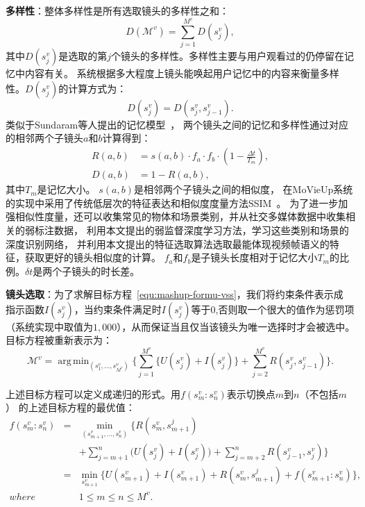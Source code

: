 \documentclass[doctor]{ustcthesis}
\DeclareMathOperator*{\argmin}{arg\,min}
\begin{document}
\textbf{多样性}：整体多样性是所有选取镜头的多样性之和：
\begin{equation}
    D(\mathcal{M}^v) = \sum_{j=1}^{M^v}{D(s_j^v)},
\end{equation}
其中$D(s_j^v)$是选取的第$j$个镜头的多样性。多样性主要与用户观看过的仍停留在记忆中内容有关。
系统根据多大程度上镜头能唤起用户记忆中的内容来衡量多样性。$D(s_j^v)$的计算方式为：
\begin{equation}
    D(s_j^v) = D(s_j^v, s_{j-1}^v).
\end{equation}
类似于Sundaram等人提出的记忆模型~\cite{sundaram2002computable}，
两个镜头之间的记忆和多样性通过对应的相邻两个子镜头$a$和$b$计算得到：
\begin{equation}
    \begin{aligned}
        R(a,b) &= s(a,b)\cdot f_a \cdot f_b \cdot (1- \frac{\Delta t}{T_m} ), \\
        D(a,b) &= 1 - R(a,b),
    \end{aligned}
\end{equation}
其中$T_m$是记忆大小。 $s(a,b)$是相邻两个子镜头之间的相似度，
在MoVieUp系统的实现中采用了传统低层次的特征表达和相似度度量方法SSIM~\cite{WangBSS04Tip}。
为了进一步加强相似性度量，还可以收集常见的物体和场景类别，并从社交多媒体数据中收集相关的弱标注数据，
利用本文提出的弱监督深度学习方法，学习这些类别和场景的深度识别网络，
并利用本文提出的特征选取算法选取最能体现视频帧语义的特征，获取更好的镜头相似度的计算。
$f_a$和$f_b$是子镜头长度相对于记忆大小$T_m$的比例。$\delta t$是两个子镜头的时长差。

\textbf{镜头选取}：为了求解目标方程~\eqref{equ:mashup-formu-vss}，我们将约束条件表示成
指示函数$I(s_j^v)$，当约束条件满足时$I(s_j^v)$等于0,否则取一个很大的值作为惩罚项
（系统实现中取值为$1,000$），从而保证当且仅当该镜头为唯一选择时才会被选中。
目标方程被重新表示为：
\begin{equation}
    \mathcal{M}^v = \argmin_{(s_1^v, \ldots, s_{M^v}^v)}
    \bigg\{ \sum_{j=1}^{M^v}{\big\{U(s_j^v) + I(s_j^v)\big\}}
    +  \sum_{j=2}^{M^v}{R(s_j^v, s_{j-1}^v)} \bigg \}.
    \label{equ:mashup-reformu-vss}
\end{equation}

上述目标方程可以定义成递归的形式。用$f(s_m^v:s_n^v)$表示切换点$m$到$n$（不包括$m$）
的上述目标方程的最优值：
\begin{eqnarray}
    f(s_m^v:s_n^v) &=& \min_{(s_{m+1}^v, \ldots, s_{n}^v)}\bigg\{ R(s_{m}^v,
        s_{m + 1}^j) \nonumber \\
        &&+ \sum_{j=m + 1}^{n}{\Big( U(s_j^v) +I(s_j^v)\Big)}
    + \sum_{j = m + 2}^{n}{R(s_{j - 1}^v, s_{j}^v)} \bigg\}  \nonumber \\
    &=& \min_{s_{m+1}^v}\bigg\{U(s_{m+1}^v) + I(s_{m+1}^v)
        + R(s_{m}^v, s_{m + 1}^j)
    +f(s_{m+1}^v:s_n^v)\bigg\}, \nonumber \\
    where&& 1\leq m \leq n \leq M^v.
    \label{equ:mashup-recur-vss}
\end{eqnarray}
\end{document}
